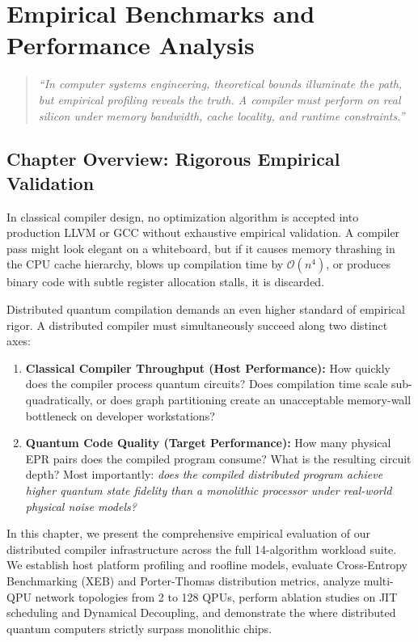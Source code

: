 \chapter{Empirical Benchmarks and Performance Analysis}
\label{ch:empirical_benchmarks}

\begin{quote}
\textit{``In computer systems engineering, theoretical bounds illuminate the path, but empirical profiling reveals the truth. A compiler must perform on real silicon under memory bandwidth, cache locality, and runtime constraints.''}
\end{quote}

\section*{Chapter Overview: Rigorous Empirical Validation}

In classical compiler design, no optimization algorithm is accepted into production LLVM or GCC without exhaustive empirical validation. A compiler pass might look elegant on a whiteboard, but if it causes memory thrashing in the CPU cache hierarchy, blows up compilation time by $\mathcal{O}(n^4)$, or produces binary code with subtle register allocation stalls, it is discarded.

Distributed quantum compilation demands an even higher standard of empirical rigor. A distributed compiler must simultaneously succeed along two distinct axes:
\begin{enumerate}
    \item \textbf{Classical Compiler Throughput (Host Performance):} How quickly does the compiler process quantum circuits? Does compilation time scale sub-quadratically, or does graph partitioning create an unacceptable memory-wall bottleneck on developer workstations?
    \item \textbf{Quantum Code Quality (Target Performance):} How many physical EPR pairs does the compiled program consume? What is the resulting circuit depth? Most importantly: \textit{does the compiled distributed program achieve higher quantum state fidelity than a monolithic processor under real-world physical noise models?}
\end{enumerate}

In this chapter, we present the comprehensive empirical evaluation of our distributed compiler infrastructure across the full 14-algorithm workload suite. We establish host platform profiling and roofline models, evaluate Cross-Entropy Benchmarking (XEB) and Porter-Thomas distribution metrics, analyze multi-QPU network topologies from 2 to 128 QPUs, perform ablation studies on JIT scheduling and Dynamical Decoupling, and demonstrate the  where distributed quantum computers strictly surpass monolithic chips.

